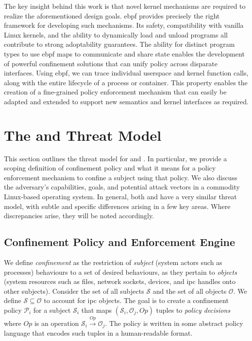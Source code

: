 The key insight behind this work is that novel kernel mechanisms are required to realize
the aforementioned design goals. \gls{ebpf} provides precisely the right framework for
developing such mechanisms. Its safety, compatibility with vanilla Linux kernels, and the
ability to dynamically load and unload programs all contribute to strong adoptability
guarantees. The ability for distinct program types to use \gls{ebpf} maps to communicate
and share state enables the development of powerful confinement solutions that can unify
policy across disparate interfaces. Using \gls{ebpf}, we can trace individual userspace
and kernel function calls, along with the entire lifecycle of a process or container. This
property enables the creation of a fine-grained policy enforcement mechanism that can
easily be adapted and extended to support new semantics and kernel interfaces as required.



\section{The \bpfbox{} and \bpfcontain{} Threat Model}%
\label{s:cp-threat-model}

This section outlines the threat model for \bpfbox{} and \bpfcontain{}. In particular, we
provide a scoping definition of confinement policy and what it means for a policy
enforcement mechanism to confine a subject using that policy. We also discuss the
adversary's capabilities, goals, and potential attack vectors in a commodity Linux-based
operating system. In general, both \bpfbox{} and \bpfcontain{} have a very similar threat
model, with subtle and specific differences arising in a few key areas. Where
discrepancies arise, they will be noted accordingly.

\subsection{Confinement Policy and Enforcement Engine}

We define \textit{confinement} as the restriction of \textit{subject} (system actors such
as processes) behaviours to a set of desired behaviours, as they pertain to
\textit{objects} (system resources such as files, network sockets, devices, and \gls{ipc}
handles onto other subjects). Consider the set of all subjects $\mathcal{S}$ and the set
of all objects $\mathcal{O}$. We define $\mathcal{S} \subseteq \mathcal{O}$ to account for
\gls{ipc} objects. The goal is to create a confinement policy $\mathcal{P}_i$ for a subject
$\mathcal{S}_i$ that maps $(\mathcal{S}_i, \mathcal{O}_j, Op)$ tuples to \textit{policy
decisions} where $Op$ is an operation $\mathcal{S}_i \xrightarrow{Op} \mathcal{O}_j$.  The
policy is written in some abstract policy language that encodes such tuples in
a human-readable format.

